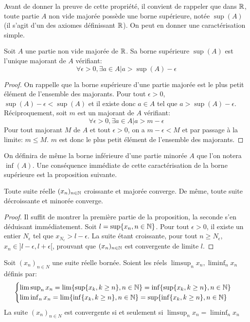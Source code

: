 Avant de donner la preuve de cette propriété, il convient de rappeler que dans $\mathbb R$, toute partie $A$ non vide majorée possède une borne supérieure, notée $\sup(A)$ (il s'agit d'un des axiomes définissant $\mathbb R$). On peut en donner une caractérisation simple.
\begin{fprop}
Soit $A$ une partie non vide majorée de $\mathbb R$. Sa borne supérieure $\sup(A)$ est l'unique majorant de $A$ vérifiant:
\[
\forall \epsilon > 0, \exists a \in A \lvert a > \sup(A) - \epsilon
\]
\end{fprop}
\begin{proof}
On rappelle que la borne supérieure d'une partie majorée est le plus petit élément de l'ensemble des majorants. Pour tout $\epsilon > 0$, $\sup(A)-\epsilon < \sup(A)$ et il existe donc $a \in A$ tel que $a > \sup(A) - \epsilon$. Réciproquement, soit $m$ est un majorant de $A$ vérifiant:
\[
\forall \epsilon > 0, \exists a \in A \lvert a > m - \epsilon
\]
Pour tout majorant $M$ de $A$ et tout $\epsilon > 0$, on a $m-\epsilon < M$ et par passage à la limite: $m \leq M$. $m$ est donc le plus petit élément de l'ensemble des majorants.
\end{proof}
On définira de même la borne inférieure d'une partie minorée $A$ que l'on notera $\inf(A)$. 
Une conséquence immédiate de cette caractérisation de la borne supérieure est la proposition suivante.
\begin{fprop}
Toute suite réelle $(x_n)_{n \in {\mathbb N}}$ croissante et majorée converge. De même, toute suite décroissante et minorée converge.
\end{fprop}
\begin{proof}
Il suffit de montrer la première partie de la proposition, la seconde s'en déduisant immédiatement.
Soit $l = \sup \{ x_n, n \in {\mathbb N} \}$. Pour tout $\epsilon > 0$, il existe un entier $N_\epsilon$ tel que $x_{N_\epsilon} > l - \epsilon$. La suite étant croissante, pour tout $n \geq N_\epsilon$, $x_n \in ]l-\epsilon, l+\epsilon[$, prouvant que $(x_n)_{n \in {\mathbb N}}$ est convergente de limite $l$.
\end{proof}
\begin{fprop}
Soit $(x_n)_{n \in N}$ une suite réelle bornée. Soient les réels $\limsup_n  x_n, \liminf_n x_n$ définis par:
\[
\begin{cases}
\limsup_n x_n = \lim \{ \sup \{ x_k, k \geq n \}, n \in {\mathbb N}\} = \inf \{ \sup \{ x_k, k \geq n \}, n \in {\mathbb N}\} \\
\liminf_n x_n = \lim \{ \inf \{ x_k, k \geq n \}, n \in {\mathbb N}\} = \sup \{ \inf \{ x_k, k \geq n \}, n \in {\mathbb N}\} \\
\end{cases}
\]
La suite $(x_n)_{n \in N}$ est convergente si et seulement si $\limsup_n  x_n =  \liminf_n x_n$
\end{fprop}
